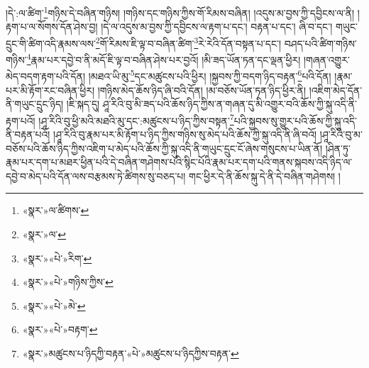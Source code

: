 །དེ་:ལ་ཚིག་\footnote{«སྣར་»ལ་ཚིགས་}གཉིས་དེ་བཞིན་གཉིས། །གཉིས་དང་གཉིས་ཀྱིས་གོ་རིམས་བཞིན། །འདུས་མ་བྱས་ཀྱི་དབྱིངས་ལ་ནི། །རྟག་པ་ལ་སོགས་དོན་ཤེས་བྱ། །དེ་ལ་འདུས་མ་བྱས་ཀྱི་དབྱིངས་ལ་རྟག་པ་དང་། བརྟན་པ་དང་། ཞི་བ་དང་། གཡུང་དྲུང་གི་ཚིག་འདི་རྣམས་ལས་\footnote{«སྣར་»ལ་}གོ་རིམས་ཇི་ལྟ་བ་བཞིན་ཚིག་\footnote{«སྣར་»«པེ་»རིག་}རེ་རེའི་དོན་བསྟན་པ་དང་། བཤད་པའི་ཚིག་གཉིས་གཉིས་\footnote{«སྣར་»«པེ་»གཉིས་ཀྱིས་}རྣམ་པར་དབྱེ་བ་ནི་མདོ་ཇི་ལྟ་བ་བཞིན་ཤེས་པར་བྱའོ། །མི་ཟད་ཡོན་ཏན་དང་ལྡན་ཕྱིར། །གཞན་འགྱུར་མེད་བདག་རྟག་པའི་དོན། །མཐའ་ཡི་མུ་\footnote{«སྣར་»«པེ་»མེ་}དང་མཚུངས་པའི་ཕྱིར། །སྐྱབས་ཀྱི་བདག་ཉིད་བརྟན་\footnote{«སྣར་»«པེ་»བརྟག་}པའི་དོན། །རྣམ་པར་མི་རྟོག་རང་བཞིན་ཕྱིར། །གཉིས་མེད་ཆོས་ཉིད་ཞི་བའི་དོན། །མ་བཅོས་ཡོན་ཏན་ཉིད་ཕྱིར་ནི། །འཇིག་མེད་དོན་ནི་གཡུང་དྲུང་ཉིད། །ཇི་སྐད་དུ། ཤཱ་རིའི་བུ་མི་ཟད་པའི་ཆོས་ཉིད་ཀྱིས་ན་གཞན་དུ་མི་འགྱུར་བའི་ཆོས་ཀྱི་སྐུ་འདི་ནི་རྟག་པའོ། །ཤཱ་རིའི་བུ་ཕྱི་མའི་མཐའི་མུ་དང་:མཚུངས་པ་ཉིད་ཀྱིས་བསྟན་\footnote{«སྣར་»མཚུངས་པ་ཉིདཀྱི་བརྟན་«པེ་»མཚུངས་པ་ཉིདཀྱིས་བརྟན་}པའི་སྐྱབས་སུ་གྱུར་པའི་ཆོས་ཀྱི་སྐུ་འདི་ནི་བརྟན་པའོ། །ཤཱ་རིའི་བུ་རྣམ་པར་མི་རྟོག་པ་ཉིད་ཀྱིས་གཉིས་སུ་མེད་པའི་ཆོས་ཀྱི་སྐུ་འདི་ནི་ཞི་བའོ། །ཤཱ་རིའི་བུ་མ་བཅོས་པའི་ཆོས་ཉིད་ཀྱིས་འཇིག་པ་མེད་པའི་ཆོས་ཀྱི་སྐུ་འདི་ནི་གཡུང་དྲུང་ངོ་ཞེས་གསུངས་པ་ཡིན་ནོ། །ཤིན་ཏུ་རྣམ་པར་དག་པ་མཐར་ཕྱིན་པའི་དེ་བཞིན་གཤེགས་པའི་སྙིང་པོའི་རྣམ་པར་དག་པའི་གནས་སྐབས་འདི་ཉིད་ལ་དབྱེ་བ་མེད་པའི་དོན་ལས་བརྩམས་ཏེ་ཚིགས་སུ་བཅད་པ། གང་ཕྱིར་དེ་ནི་ཆོས་སྐུ་དེ་ནི་དེ་བཞིན་གཤེགས། །
